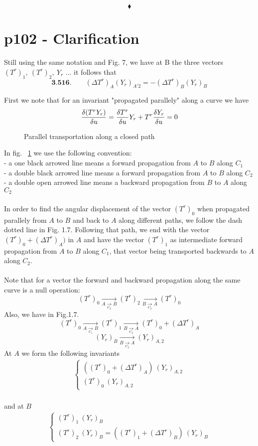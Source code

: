 $$\blacklozenge$$
\newpage


\section{p102 - Clarification}
\begin{tcolorbox}
Still using the same notation and Fig. 7, we have at B the three vectors $(T^r)_1,\ (T^r)_2,\ Y_r$ ...  it follows that $$\textbf{3.516.}\quad \quad (\Delta T^r)_A(Y_r)_{A'2}= - (\Delta T^r)_B(Y_r)_B$$
\end{tcolorbox}
First we note that for an invariant "propagated parallely" along a curve we have $$\fdv{(T^r Y_r)}{u} = \fdv{T^r} {u}Y_r+T^r\fdv{Y_r}{u}=0$$
\begin{figure}[h]

\caption{Parallel transportation along a  closed path}
\label{fig:fig_p102_3516_a}
\end{figure}
In fig. ~\ref{fig:fig_p102_3516_a} we use the following convention:\\
- a one black arrowed line means a forward propagation from $A$ to $B$ along $C_1$\\
- a double black arrowed line means a forward propagation from $A$ to $B$ along $C_2$\\
- a double open arrowed line means a backward propagation from $B$ to $A$ along $C_2$\\\\
In order to find the angular displacement of the vector $(T^r)_0$ when propagated parallely from $A$ to $B$ and back to $A$ along different paths, we follow  the dash dotted line in Fig. 1.7. Following that path, we end with the vector $(T^r)_0+ (\Delta T^r)_{A})$ in $A$ and have the vector $(T^r)_1$ as intermediate forward propagation from $A$ to $B$ along $C_1$, that vector being transported backwards to $A$ along $C_2$.\\\\
Note that for a vector the forward and backward propagation along the same curve is a null operation:$$(T^r)_0 \underset{\underset{C_2}{A\rightarrow B}}{\rightarrow} (T^r)_2 \underset{\underset{C_2}{B\rightarrow A}}{\rightarrow} (T^r)_0$$
Also, we have in Fig.1.7.
$$(T^r)_0 \underset{\underset{C_1}{A\rightarrow B}}{\rightarrow} (T^r)_1 \underset{\underset{C_2}{B\rightarrow A}}{\rightarrow} (T^r)_0+ (\Delta T^r)_{A}$$
$$(Y_r)_{B} \underset{\underset{C_2}{B\rightarrow A}}{\rightarrow} (Y_r)_{A,2}$$
At $A$ we form the following invariants
\begin{align}
\left \{ \begin{array}{l}
 ((T^r)_0+ (\Delta T^r)_{A})\ (Y_r)_{A,2}\\
 (T^r)_0 \ (Y_r)_{A,2}
\end{array} \right.
\end{align}\\
and at $B$
\begin{align}
\left \{ \begin{array}{l}
 (T^r)_1\ (Y_r)_{B}\\
 (T^r)_2 \ (Y_r)_{B} = ((T^r)_1+(\Delta T^r)_B )\ (Y_r)_{B}
\end{array} \right.
\end{align}\\

